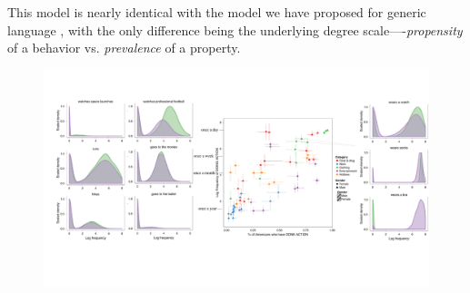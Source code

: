 \documentclass[10pt,letterpaper]{article}
\newcommand{\ndg}[1]{\textcolor{Green}{[ndg: #1]}}
\begin{document}
This model is nearly identical with the model we have proposed for generic language \cite{TesslerUnderReview}, with the only difference being the underlying degree scale----\emph{propensity} of a behavior vs. \emph{prevalence} of a property. 

%
%



%
% 

\begin{figure}[t]
\centering
  \includegraphics[width=\textwidth]{prior-scatter-insets}
  \caption{}
  \label{fig:priorScatter}
\end{figure}
%
\end{document}
